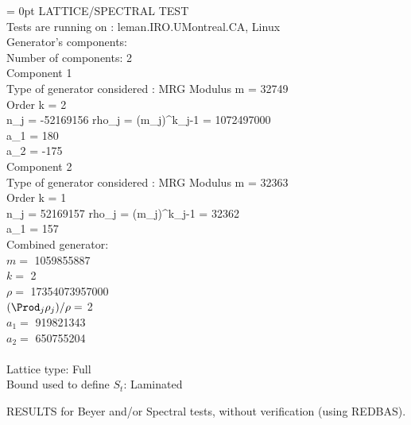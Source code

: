 \parindent = 0pt 
 LATTICE/SPECTRAL TEST \\
 Tests are running on : leman.IRO.UMontreal.CA, Linux\\

 Generator's components:\\
 Number of components:  2\\

 Component  1 \\ 
   Type of generator considered : MRG
   Modulus  m = 32749 \\ 
   Order    k = 2 \\ 
   n_j        = -52169156
   rho_j = (m_j)^k_j-1 = 1072497000 \\ 
   a_1 = 180 \\ 
   a_2 = -175 \\ 

 Component  2 \\ 
   Type of generator considered : MRG
   Modulus  m = 32363 \\ 
   Order    k = 1 \\ 
   n_j        = 52169157
   rho_j = (m_j)^k_j-1 = 32362 \\ 
   a_1 = 157 \\ 

 Combined generator:\\
   $m =$       1059855887 \\
   $k =$ 2\\
   $\rho =$ 17354073957000\\
   $(\Prod_j \rho_j) /\rho =$ 2\\
   $a_1 =$        919821343\\
   $a_2 =$        650755204\\
\\
 Lattice type: Full \\
 Bound used to define $S_t$: Laminated


RESULTS for Beyer and/or Spectral tests, without verification (using REDBAS).\\

